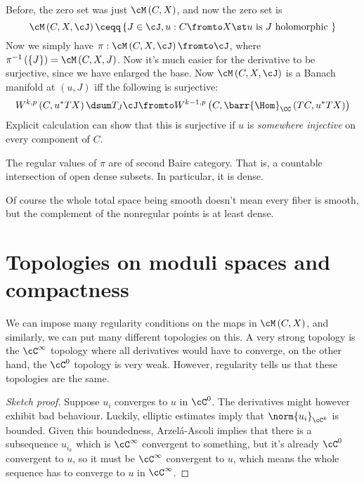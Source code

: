\documentclass{amsart}
\begin{document}
Before, the zero set was just $\cM\left( C , X \right)$, and now
the zero set is
\begin{equation}
\cM\left( C , X , \cJ \right) \ceqq
\left\{ J\in \cJ , u: C\fromto X \st
u \text{ is } J \text{ holomorphic }\right\}
\end{equation}
Now we simply have $\pi: \cM\left( C , X , \cJ \right) \fromto \cJ$, 
where $\pi^{-1}\left( \left\{ J \right\} \right) = \cM\left( C , X , J \right)$.
Now it's much easier for the derivative to be surjective, since we have enlarged the base.
Now $\cM\left( C , X , \cJ \right)$ is a Banach manifold at $\left( u , J \right)$ iff
the following is surjective:
\begin{equation}
W^{k,p}\left( C , u^* TX \right)\dsum T_J \cJ
\fromto W^{k-1 , p}\left( C , \barr{\Hom}_\CC\left( TC , u^* TX \right) \right)
\end{equation}
Explicit calculation can show that this is surjective if $u$ is \emph{somewhere injective}
on every component of $C$.

\begin{thm}
\label{thm:sard_smale}
The regular values of $\pi$ are of second Baire category.
That is, a countable intersection of open dense subsets.
In particular, it is dense.
\end{thm}

Of course the whole total space being smooth doesn't mean every fiber is smooth, but
the complement of the nonregular points is at least dense. 

\section{Topologies on moduli spaces and compactness}

We can impose many regularity conditions on the maps in $\cM\left( C , X \right)$,
and similarly, we can put many different topologies on this. 
A very strong topology is the $\cC^\infty$ topology where all derivatives would have to converge, 
on the other hand, the $\cC^0$ topology is very weak. 
However, regularity tells us that these topologies are the same.

\begin{proof}[Sketch proof]
Suppose $u_i$ converges to $u$ in $\cC^0$.
The derivatives might however exhibit bad behaviour.
Luckily, elliptic estimates imply that $\norm{u_i}_{\cC^k}$ is bounded.
Given this boundedness, Arzel\'a-Ascoli implies that there is a subsequence $u_{i_k}$
which is $\cC^\infty$ convergent to something, but it's already
$\cC^0$ convergent to $u$, so it must be $\cC^\infty$ convergent to $u$,
which means the whole sequence has to converge to $u$ in $\cC^\infty$.
\end{proof}
\end{document}
